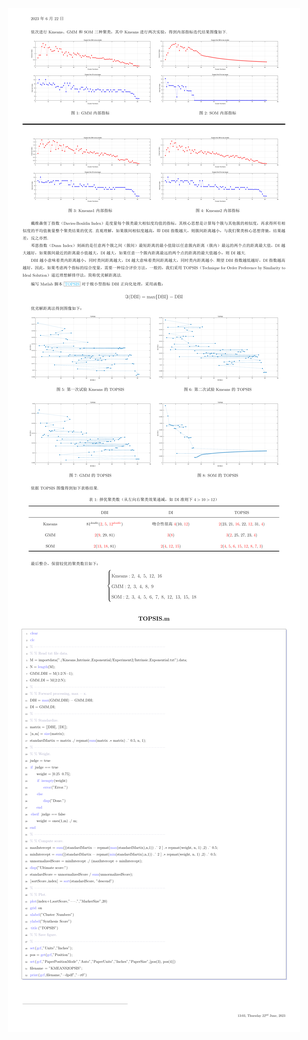 \documentclass[oneside,UTF8]{article}
\numberwithin{figure}{section}
\numberwithin{table}{section}
\numberwithin{equation}{section}
\begin{document}
\begin{figure}[H]
	\centering
	\includegraphics*[scale=0.18]{./images/demo.pdf}
\end{figure}
\end{document}

